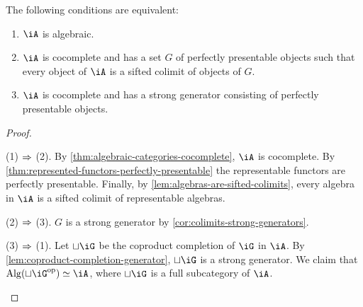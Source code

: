 \documentclass{zett}
\begin{document}
\begin{thm}
  The following conditions are equivalent:
  \begin{enumerate}
  \item $\iA$ is algebraic.
  \item $\iA$ is cocomplete and has a set $G$ of perfectly presentable objects such that every object of $\iA$ is a sifted colimit of objects of $G$.
  \item $\iA$ is cocomplete and has a strong generator consisting of perfectly presentable objects.
  \end{enumerate}
\end{thm}
\begin{proof}
  \begin{node}
    (1) $\Rightarrow$ (2).
    By \cref{thm:algebraic-categories-cocomplete}, $\iA$ is cocomplete.
    By \cref{thm:represented-functors-perfectly-presentable} the representable functors are perfectly presentable.
    Finally, by \cref{lem:algebras-are-sifted-colimits}, every algebra in $\iA$ is a sifted colimit of representable algebras.
  \end{node}
  \begin{node}
    (2) $\Rightarrow$ (3).
    $G$ is a strong generator by \cref{cor:colimits-strong-generators}.
  \end{node}
  \begin{node}
    (3) $\Rightarrow$ (1).
    Let $\sqcup\iG$ be the coproduct completion of $\iG$ in $\iA$.
    By \cref{lem:coproduct-completion-generator}, $\sqcup\iG$ is a strong generator.
    We claim that $\Alg(\sqcup\iG\op) \eqv \iA$, where $\sqcup\iG$ is a full subcategory of $\iA$.
    \todo{}
  \end{node}
\end{proof}




\end{document}
